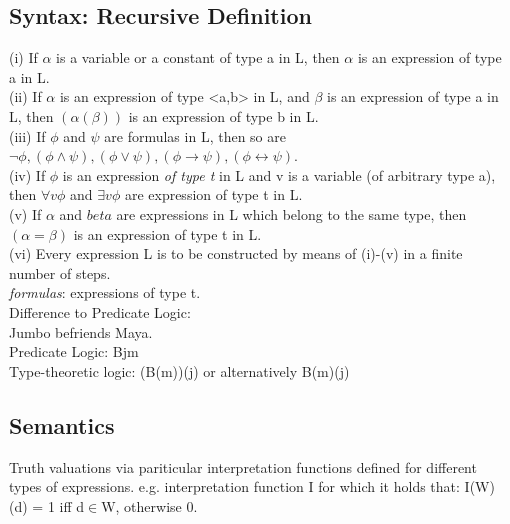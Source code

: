 \subsection*{Syntax: Recursive Definition}
(i) If $\alpha$ is a variable or a constant of type a in L, then $\alpha$ is an expression of type a in L.\\
(ii) If $\alpha$ is an expression of type <a,b> in L, and $\beta$ is an expression of type a in L, then $(\alpha (\beta))$ is an expression of type b in L.\\
(iii) If $\phi$ and $\psi$ are formulas in L, then so are $\neg \phi, (\phi \land \psi), (\phi \lor \psi), (\phi \to \psi), (\phi \leftrightarrow \psi)$.\\
(iv) If $\phi$ is an expression \emph{of type t} in L and v is a variable (of arbitrary type a), then $\forall v \phi$ and $\exists v \phi$ are expression of type t in L.\\
(v) If $\alpha$ and $beta$ are expressions in L which belong to the same type, then $(\alpha = \beta)$ is an expression of type t in L.\\
(vi) Every expression L is to be constructed by means of (i)-(v) in a finite number of steps.\\
\emph{formulas}: expressions of type t. \\
Difference to Predicate Logic: \\
Jumbo befriends Maya. \\
Predicate Logic: Bjm \\
Type-theoretic logic: (B(m))(j) or alternatively B(m)(j) 
\subsection*{Semantics}
Truth valuations via pariticular interpretation functions defined for different types of expressions. e.g. interpretation function I for which it holds that: I(W)(d) = 1 iff d$\in$W, otherwise 0. 